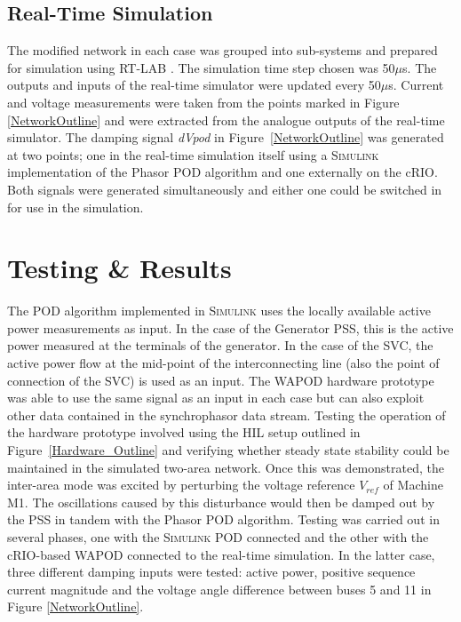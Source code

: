 \documentclass[journal]{IEEEtran}
\begin{document}
\subsection{Real-Time Simulation}
The modified network in each case was grouped into sub-systems and prepared for simulation using RT-LAB \cite{eMEGASIM}. The simulation time step chosen was 50$\mu$s. The outputs and inputs of the real-time simulator were updated every 50$\mu$s. Current and voltage measurements were taken from the points marked in Figure \ref{NetworkOutline} and were extracted from the analogue outputs of the real-time simulator. The damping signal \emph{dVpod} in Figure~\ref{NetworkOutline} was generated at two points; one in the real-time simulation itself using a \textsc{Simulink} implementation of the Phasor POD algorithm and one externally on the cRIO. Both signals were generated simultaneously and either one could be switched in for use in the simulation.

\section{Testing \& Results}\label{Results}
The POD algorithm implemented in \textsc{Simulink} uses the locally available active power measurements as input. In the case of the Generator PSS, this is the active power measured at the terminals of the generator. In the case of the SVC, the active power flow at the mid-point of the interconnecting line (also the point of connection of the SVC) is used as an input. The WAPOD hardware prototype was able to use the same signal as an input in each case but can also exploit other data contained in the synchrophasor data stream. Testing the operation of the hardware prototype involved using the HIL setup outlined in Figure~\ref{Hardware_Outline} and verifying whether steady state stability could be maintained in the simulated two-area network. Once this was demonstrated, the inter-area mode was excited by perturbing the voltage reference $V_{ref}$ of Machine M1. The oscillations caused by this disturbance would then be damped out by the PSS in tandem with the Phasor POD algorithm. Testing was carried out in several phases, one with the \textsc{Simulink} POD connected and the other with the cRIO-based WAPOD connected to the real-time simulation. In the latter case, three different damping inputs were tested: active power, positive sequence current magnitude and the voltage angle difference between buses 5 and 11 in Figure \ref{NetworkOutline}.
\vspace{-0.7em}
\end{document}
